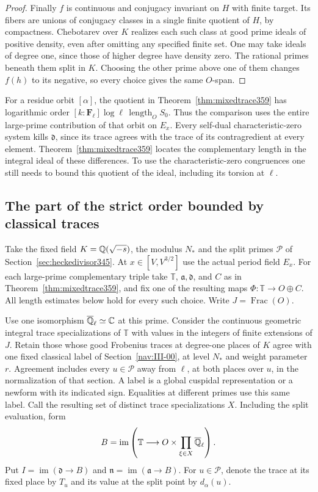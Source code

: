 \documentclass[a4paper,11pt]{article}
\theoremstyle{definition}
\theoremstyle{remark}
\newcommand{\len}{\operatorname{length}}\newcommand{\Res}{\operatorname*{Res}}
\numberwithin{equation}{section}
\begin{document}
\begin{proof}
Finally \(f\) is continuous and conjugacy invariant on \(H\)
with finite target. Its fibers are unions of conjugacy classes
in a single finite quotient of \(H\), by compactness. Chebotarev
over \(K\) realizes each such class at good prime ideals of
positive density, even after omitting any specified finite set.
One may take ideals of degree one, since those of higher degree
have density zero. The rational primes beneath them split in
\(K\). Choosing the other prime above one of them changes
\(f(h)\) to its negative, so every choice gives the same
\(O\)-span.
\end{proof}

For a residue orbit \([\alpha]\), the quotient in
Theorem~\ref{thm:mixedtrace359} has logarithmic order
\([k:\mathbf F_\ell]\log\ell\,\len_O S_0\). Thus the comparison
uses the entire large-prime contribution of that orbit on \(E_x\).
Every self-dual characteristic-zero system kills \(\mathfrak d\),
since its trace agrees with the trace of its contragredient at
every element. Theorem~\ref{thm:mixedtrace359} locates the
complementary length in the integral ideal of these differences.
To use the characteristic-zero congruences one still needs to
bound this quotient of the ideal, including its torsion at \(\ell\).


\subsection{The part of the strict order bounded by classical traces}\label{sec:classicaldefect360}

Take the fixed field \(K=\mathbb Q(\sqrt{-s})\), the modulus \(N_*\)
and the split primes \(\mathcal P\) of Section~\ref{sec:heckedivisor345}.
At \(x\in[V,V^{3/2}]\) use the actual period field \(E_x\).
For each large-prime complementary triple take \(\mathbb T\),
\(\mathfrak a,\mathfrak d\), and \(C\) as in
Theorem~\ref{thm:mixedtrace359}, and fix one of the resulting maps
\(\Phi:\mathbb T\to O\oplus C\). All length estimates below hold
for every such choice. Write \(J=\operatorname{Frac}(O)\).

Use one isomorphism \(\overline{\mathbb Q}_\ell\simeq\mathbb C\) at this prime.
Consider the continuous geometric integral trace specializations
of \(\mathbb T\) with values in the integers of finite extensions
of \(J\). Retain those whose good Frobenius traces at degree-one
places of \(K\) agree with one fixed classical label of
Section~\ref{nav:III-00}, at level \(N_*\) and weight parameter
\(r\). Agreement includes every \(u\in\mathcal P\) away from
\(\ell\), at both places over \(u\), in the normalization of
that section. A label is a global cuspidal representation or a
newform with its indicated sign. Equalities at different primes
use this same label. Call the resulting set of distinct trace
specializations \(X\). Including the split evaluation, form
\[
 B=\operatorname{im}\left(\mathbb T\longrightarrow
                 O\times\prod_{\xi\in X}\overline{\mathbb Q}_\ell\right).
\]
Put \(I=\operatorname{im}(\mathfrak d\to B)\) and
\(\mathfrak n=\operatorname{im}(\mathfrak a\to B)\).
For \(u\in\mathcal P\), denote the trace at its fixed place
by \(T_u\) and its value at the split point by \(d_\alpha(u)\).
\end{document}
